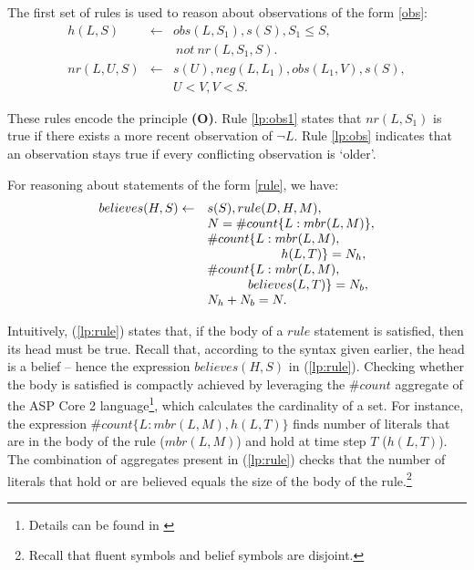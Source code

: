 \documentclass{article}
\def\naf{\: {not} \:}
\begin{document}
The first set of rules is used to  reason about observations of the form 
\eqref{obs}:
%
\begin{eqnarray}  
h(L, S)  & \leftarrow &   obs(L,S_1), s(S),  S_1 \le S, \label{lp:obs} \\
&&\naf nr(L, S_1, S).    \nonumber\\
  nr(L, U, S)  & \leftarrow &  s(U), neg(L,L_1), obs(L_1, V), s(S), \label{lp:obs1} \\
  &&U {<} V, V {<} S.  \nonumber  %
\end{eqnarray} 

These rules encode the principle {\bf (O)}. Rule \eqref{lp:obs1} states that $nr(L,S_1)$ is true if there exists a more recent observation of  $\neg L$. Rule \eqref{lp:obs} indicates that an observation stays true if every conflicting observation is `older'.
 
 For reasoning about statements of the form \eqref{rule}, we have:  %
%
\begin{equation}\label{lp:rule}
\begin{array}{ll}
believes(H, S) \leftarrow & s(S),  rule(D, H, M),  \\
        & N  = \# count \{L : mbr(L, M)\},\\
        & \# count \{L : mbr(L, M),\\
        &\hspace*{.8in}h(L, T) \}= N_h,  \\ 
        & \# count \{L : mbr(L, M),\\
        &\hspace*{.44in}believes(L, T) \}= N_b, \\
        & N_h+N_b=N.  \\ 
%
      \end{array}
\end{equation} 

%
Intuitively, (\ref{lp:rule}) states that, if the body of a $rule$ statement is satisfied, then its head must be true. Recall that, according to the syntax given earlier, the head is a belief -- hence the expression $believes(H,S)$ in (\ref{lp:rule}). Checking whether the body is satisfied is compactly achieved by leveraging the $\#count$ aggregate of the ASP Core 2 language\footnote{Details can be found in \cite{ASPCore2Standard}}, which calculates the cardinality of a set. For instance, the expression $\# count \{L : mbr(L, M), h(L, T) \}$ finds number of literals that are in the body of the rule ($mbr(L,M)$) and hold at time step $T$ ($h(L,T)$). The combination of aggregates present in (\ref{lp:rule}) checks that the number of literals that hold or are believed equals the size of the body of the rule.\footnote{Recall that fluent symbols and belief symbols are disjoint. }
\end{document}
